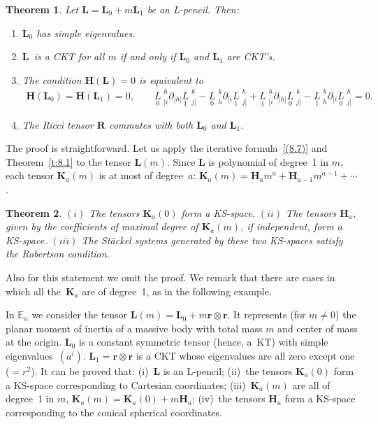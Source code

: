\documentclass[pdftex]{sigma}
\def\bs{\boldsymbol}
\numberwithin{equation}{section}
\newtheorem{Theorem}{Theorem}[section]
 { \theoremstyle{definition}
\newtheorem{Notation}[Theorem]{Notation}
\newtheorem{Example}[Theorem]{Example}
\newtheorem{Remark}[Theorem]{Remark}
\newtheorem{Remarks}[Theorem]{Remarks}
 }
\begin{document}
\begin{Theorem}
Let $\bs L=\bs L_0+m\bs L_1$ be an L-pencil. Then:
\begin{enumerate}\itemsep=0pt
\item[$(i)$] $\bs L_0$ has simple eigenvalues.
 \item[$(ii)$] $\bs L$~is a CKT for all $m$ if and only if $\bs L_0$ and $\bs L_1$ are CKT's.

\item[$(iii)$] The condition $\bs H(\bs L)=0$ is equivalent to
 \begin{gather*}
\bs H(\bs L_0)=\bs H(\bs L_1)=0, \qquad
\underset{0}{L}{\phantom |}_{[i}^h \partial_{|h|} \underset{1}{L}{\phantom |}_{j]}^k
-\underset{0}{L}{\phantom |}_h^k \partial_{[i} \underset{1}{L}{\phantom |}_{j]}^h
+
\underset{1}{L}{\phantom |}_{[i}^h \partial_{|h|} \underset{0}{L}{\phantom |}_{j]}^k
-\underset{1}{L}{\phantom |}_h^k \partial_{[i} \underset{0}{L}{\phantom |}_{j]}^h=0.
\end{gather*}
\item[$(iv)$]  The Ricci tensor $\bs R$ commutes with both $\bs L_0$ and $\bs L_1$.
\end{enumerate}
\end{Theorem}

The proof is straightforward. Let us apply the iterative formula~\eqref{(8.7)} and Theorem~\ref{t:8.1} to the tensor $\bs L(m)$. Since $\bs L$ is polynomial of degree~1 in $m$, each tensor $\bs K_a(m)$ is at most of degree~$a$:
$\bs K_a(m)=\bs H_a m^a+\bs H_{a-1}m^{a-1}+\cdots$.

\begin{Theorem}
$(i)$ The tensors $\bs K_a(0)$ form a KS-space.
$(ii)$ The tensors $\bs H_a$, given by the coefficients of maximal degree of $\bs K_a(m)$, if independent, form a KS-space. $(iii)$ The St\"ackel systems generated by these two KS-spaces satisfy the Robertson condition.
\end{Theorem}

Also for this statement we omit the proof. We remark that there are cases in which all the~$\bs K_a$ are of degree~1, as in the following example.

\begin{Example} In $\mathbb E_n$ we consider the tensor $\bs L(m)=\bs L_0+m \bs r\otimes\bs r$. It represents (for $m\neq 0$) the planar moment of inertia of a massive body with total mass $m$ and center of mass at the origin. $\bs L_0$ is a constant symmetric tensor (hence, a~KT) with simple eigenvalues~$(a^i)$. $\bs L_1=\bs r\otimes \bs r$ is a CKT whose eigenvalues are all zero except one ($={}r^2$). It can be proved that: (i)~$\bs L$ is an L-pencil; (ii)~the tensors $\bs K_a(0)$ form a KS-space corresponding to Cartesian coordinates; (iii)~$\bs K_a(m)$ are all of degree~1 in $m$, $\bs K_a(m)=\bs K_a(0)+m \bs H_a$; (iv)~the tensors $\bs H_a$ form a KS-space corresponding to the conical spherical coordinates.
\end{Example}
\end{document}
